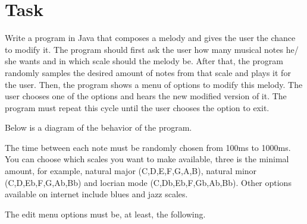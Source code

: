 \documentclass[a4paper]{article}
\begin{document}
	
	
	
	\section{Task}
	\label{sec:task}
	Write a program in Java that composes a melody and gives the user the chance to modify it. The program should first ask the user how many musical notes he/ she wants and in which scale should the melody be. After that, the program randomly samples the desired amount of notes from that scale and plays it for the user. Then, the program shows a menu of options to modify this melody. The user chooses one of the options and hears the new modified version of it. The program must repeat this cycle until the user chooses the option to exit.
	
	Below is a diagram of the behavior of the program.
	
	\usetikzlibrary{arrows,positioning} 
	{\centering
	}
	
	The time between each note must be randomly chosen from 100ms to 1000ms. You can choose which scales you want to make available, three is the minimal amount, for example, natural major (C,D,E,F,G,A,B), natural minor (C,D,Eb,F,G,Ab,Bb) and locrian mode (C,Db,Eb,F,Gb,Ab,Bb). Other options available on internet include blues and jazz scales.
	
	The edit menu options must be, at least, the following.
	
\end{document}
